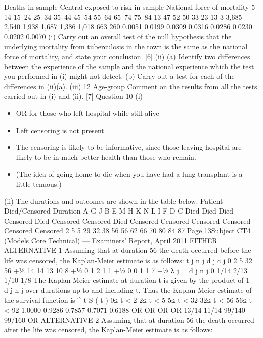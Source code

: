 \documentclass[a4paper,12pt]{article}
\begin{document}
\begin{enumerate}
Deaths in
sample Central exposed to
risk in sample National force
of mortality
5–14
15–24
25–34
35–44
45–54
55–64
65–74
75–84 13
47
52
50
33
23
13
3 3,685
2,540
1,938
1,687
1,386
1,018
663
260 0.0051
0.0199
0.0309
0.0316
0.0286
0.0230
0.0202
0.0070
(i) Carry out an overall test of the null hypothesis that the underlying mortality
from tuberculosis in the town is the same as the national force of mortality,
and state your conclusion.
[6]
(ii) (a)
Identify two differences between the experience of the sample
and the national experience which the test you performed in (i)
might not detect.
(b)
Carry out a test for each of the differences in (ii)(a).
(iii)
12
Age-group
Comment on the results from all the tests carried out in (i) and (ii).
[7]
Question 10
(i)
\begin{itemize}
\ite Right censoring is present
for those still alive and in hospital at the end of August
\item OR
for those who left hospital while still alive
\item Left censoring is not present
\item The censoring is likely to be informative, since those leaving hospital are likely to be in much better health than those who remain. 
\item (The idea of going home to die when you have had a lung transplant is a little tenuous.)
\end{itemize}
(ii)
The durations and outcomes are shown in the table below.
Patient Died/Censored Duration
A
G
J
B
E
M
H
K
N
L
I
F
D
C Died
Died
Died
Censored
Died
Censored
Censored
Died
Censored
Censored
Censored
Censored
Censored
Censored 2
5
5
29
32
38
56
56
62
66
70
80
84
87
Page 13Subject CT4 (Models Core Technical) — Examiners’ Report, April 2011
EITHER ALTERNATIVE 1
Assuming that at duration 56 the death occurred before the life was censored, the
Kaplan-Meier estimate is as follows:
t j n j d j c j
0
2
5
32
56
+1⁄2 14
14
13
10
8
+1⁄2 0
1
2
1
1
+1⁄2 0
0
1
1
7
+1⁄2
λ j =
d j
n j
0
1/14
2/13
1/10
1/8
The Kaplan-Meier estimate at duration t is given by the product of 1 −
d j
n j
over
durations up to and including t. Thus the Kaplan-Meier estimate of the survival
function is
^
t S ( t )
0≤ t < 2
2≤ t < 5
5≤ t < 32
32≤ t < 56
56≤ t < 92 1.0000
0.9286
0.7857
0.7071
0.6188
OR
OR
OR
OR
13/14
11/14
99/140
99/160
OR ALTERNATIVE 2
Assuming that at duration 56 the death occurred after the life was censored, the Kaplan-Meier estimate is as follows:


\end{enumerate}
\end{document}

